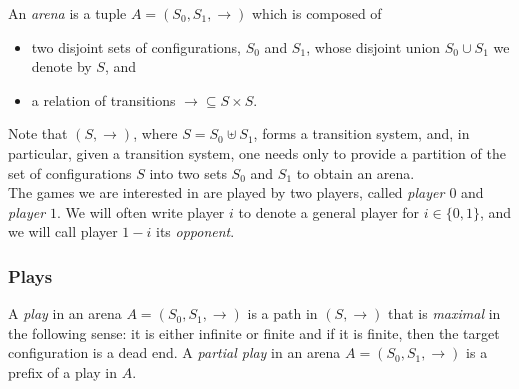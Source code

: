 \documentclass[a4paper,UKenglish,cleveref, autoref, thm-restate]{lipics-v2021}
\newcommand\mh[1]{\todo[inline,size=\scriptsize]{#1 - \textbf{Mathieu}}}
\begin{document}
\begin{samepage}
An {\em arena} is a tuple $A=(S_0, S_1,{\rightarrow})$  which is composed of
\begin{itemize}
	\item two  disjoint  sets of configurations, $S_0$ and $S_1$, %
	whose disjoint union $S_0 \cup S_1$ we denote by $S$, and
	\item a relation of %
		transitions
	 ${\rightarrow} \subseteq S \times %
	 				S$. \\
\end{itemize}
\end{samepage}

\noindent
Note that $(S,{\rightarrow})$, where $S=S_0 \uplus S_1$, forms
a %
transition system, and, in particular, given a 
transition system,
one needs only to provide 
a partition of the set of configurations $S$ into two sets $S_0$ and $S_1$ to obtain an arena. \\



\noindent
The games we are interested in are played by two players, called {\em player $0$} and {\em player $1$}. We will often write player $i$ to denote a general player for $i \in \{0,1 \}$,
and we will call player $1-i$ its {\em opponent}. 

 \subsubsection{Plays}


\noindent
%
A {\em play} in an arena $A=(S_0,S_1,\rightarrow)$ is a path in $(S,{\rightarrow})$ that is {\em maximal} in the following sense: it is either infinite or finite and if it is finite, then the target configuration is a dead end. 
A {\em partial play} in an arena $A=(S_0,S_1,\rightarrow)$ is a 
prefix of a play in $A$.\\
\end{document}
